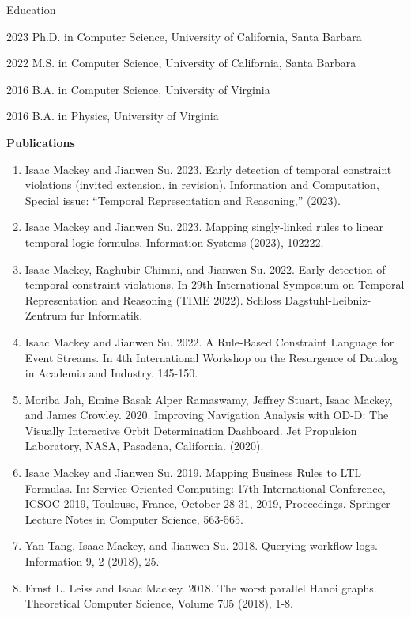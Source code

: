 \begin{vitae}
\vspace{-0.4cm}

\begin{vitaesection}{Education}
\vspace{-0.1cm}
\item [2023] 	Ph.D. in Computer Science, University of California, Santa Barbara
\item [2022]	M.S. in Computer Science, University of California, Santa Barbara
\item [2016]	B.A. in Computer Science, University of Virginia
\item [2016]	B.A. in Physics, University of Virginia
\end{vitaesection}

\textbf{Publications}
\begin{enumerate}
    \item Isaac Mackey and Jianwen Su. 2023. Early detection of temporal constraint violations (invited extension, in revision). Information and Computation, Special issue: ``Temporal Representation and Reasoning,'' (2023).
    \item Isaac Mackey and Jianwen Su. 2023. Mapping singly-linked rules to linear temporal logic formulas. Information Systems (2023), 102222.
    \item Isaac Mackey, Raghubir Chimni, and Jianwen Su. 2022. Early detection of temporal constraint violations. In 29th International Symposium on Temporal Representation and Reasoning (TIME 2022). Schloss Dagstuhl-Leibniz-Zentrum fur Informatik.
    \item Isaac Mackey and Jianwen Su. 2022. A Rule-Based Constraint Language for Event Streams. In 4th International Workshop on the Resurgence of Datalog in Academia and Industry. 145-150.
    \item Moriba Jah, Emine Basak Alper Ramaswamy, Jeffrey Stuart, Isaac Mackey, and James Crowley. 2020. Improving Navigation Analysis with OD-D: The Visually Interactive Orbit Determination Dashboard. Jet Propulsion Laboratory, NASA, Pasadena, California. (2020).
    \item Isaac Mackey and Jianwen Su. 2019. Mapping Business Rules to LTL Formulas. In: Service-Oriented Computing: 17th International Conference, ICSOC 2019, Toulouse, France, October 28-31, 2019, Proceedings. Springer Lecture Notes in Computer Science, 563-565.
    \item Yan Tang, Isaac Mackey, and Jianwen Su. 2018. Querying workflow logs. Information 9, 2 (2018), 25.
    \item Ernst L. Leiss and Isaac Mackey. 2018. The worst parallel Hanoi graphs. Theoretical Computer Science, Volume 705 (2018), 1-8.
\end{enumerate}


\end{vitae}

